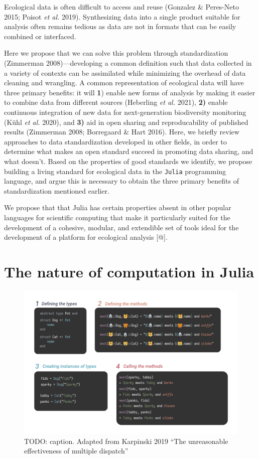 \documentclass[11pt]{article}
\makeatletter
\def\maxwidth{\ifdim\Gin@nat@width>\linewidth\linewidth
\else\Gin@nat@width\fi}
\let\Oldincludegraphics\includegraphics
\renewcommand{\includegraphics}[1]{\Oldincludegraphics[width=\maxwidth]{#1}}
\makeatother
\begin{document}
Ecological data is often difficult to access and reuse (Gonzalez \&
Peres-Neto 2015; Poisot \emph{et al.} 2019). Synthesizing data into a
single product suitable for analysis often remains tedious as data are
not in formats that can be easily combined or interfaced.

Here we propose that we can solve this problem through standardization
(Zimmerman 2008)---developing a common definition such that data
collected in a variety of contexts can be assimilated while minimizing
the overhead of data cleaning and wrangling. A common representation of
ecological data will have three primary benefits: it will \textbf{1})
enable new forms of analysis by making it easier to combine data from
different sources (Heberling \emph{et al.} 2021), \textbf{2)} enable
continuous integration of new data for next-generation biodiversity
monitoring (Kühl \emph{et al.} 2020), and \textbf{3)} aid in open
sharing and reproducability of published results (Zimmerman 2008;
Borregaard \& Hart 2016). Here, we briefly review approaches to data
standardization developed in other fields, in order to determine what
makes an open standard succeed in promoting data sharing, and what
doesn't. Based on the properties of good standards we identify, we
propose building a living standard for ecological data in the
\texttt{Julia} programming language, and argue this is necessary to
obtain the three primary benefits of standardization mentioned earlier.

We propose that that Julia has certain properties absent in other
popular languages for scientific computing that make it particularly
suited for the development of a cohesive, modular, and extendible set of
tools ideal for the development of a platform for ecological analysis
{[}@{]}.

\hypertarget{the-nature-of-computation-in-julia}{%
\section{The nature of computation in
Julia}\label{the-nature-of-computation-in-julia}}

\begin{figure}
\centering
\includegraphics{./figures/multiple_dispatch.png}
\caption{TODO: caption. Adapted from Karpinski 2019 ``The unreasonable
effectiveness of multiple dispatch''}
\end{figure}
\end{document}
